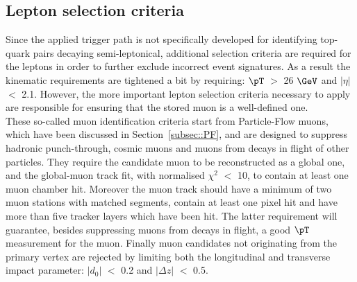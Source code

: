 \subsection{Lepton selection criteria}
Since the applied trigger path is not specifically developed for identifying top-quark pairs decaying semi-leptonical, additional selection criteria are required for the leptons in order to further exclude incorrect event signatures. As a result the kinematic requirements are tightened a bit by requiring: $\pT$ $>$ 26 $\GeV$ and $\vert \eta \vert$ $<$ 2.1.
However, the more important lepton selection criteria necessary to apply are responsible for ensuring that the stored muon is a well-defined one.
\\
These so-called muon identification criteria start from Particle-Flow muons, which have been discussed in Section~\ref{subsec::PF}, and are designed to suppress hadronic punch-through, cosmic muons and muons from decays in flight of other particles.
They require the candidate muon to be reconstructed as a global one, and the global-muon track fit, with normalised $\chi^{2}$ $<$ 10, to contain at least one muon chamber hit.
Moreover the muon track should have a minimum of two muon stations with matched segments, contain at least one pixel hit and have more than five tracker layers which have been hit. The latter requirement will guarantee, besides suppressing muons from decays in flight, a good $\pT$ measurement for the muon.
Finally muon candidates not originating from the primary vertex are rejected by limiting both the longitudinal and transverse impact parameter: $\vert d_0 \vert$ $<$ 0.2 and $\vert \Delta z \vert$ $<$ 0.5.

